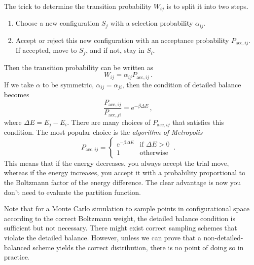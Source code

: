 \documentclass{article}
\theoremstyle{plain}\theoremheaderfont{\normalfont\itshape}\theorembodyfont{\rmfamily}\theoremseparator{.}\newtheorem*{rem}{Remark}\newtheorem*{ex}{Example}\newtheorem*{proof}{Proof}\newtheorem*{altp}{Alternative proof}
\theoremstyle{plain}\theoremheaderfont{\normalfont\bfseries}\theorembodyfont{\rmfamily}\theoremseparator{.}\newtheorem{thm}{Theorem}[section]\newtheorem{lem}[thm]{Lemma}\newtheorem{prop}[thm]{Proposition}\newtheorem*{cor}{Corollary}\newtheorem{defn}[thm]{Definition}\newtheorem{clm}[thm]{Claim}\newtheorem{clminproof}{Claim}\newtheorem{alg}[thm]{Algorithm}\newtheorem{hyp}[thm]{Hypothesis}\newtheorem{law}[thm]{Law}
\theoremstyle{break}\theoremheaderfont{\normalfont\itshape}\theorembodyfont{\rmfamily}\theoremseparator{.\medskip}\newtheorem*{proofskip}{Proof}\newtheorem*{exs}{Examples}\newtheorem*{rems}{Remarks}
\theoremstyle{break}\theoremheaderfont{\normalfont\bfseries}\theorembodyfont{\rmfamily}\theoremseparator{.\medskip}\newtheorem{lemskip}[thm]{Lemma}\newtheorem{defnskip}[thm]{Definition}\newtheorem{propskip}[thm]{Proposition}\newtheorem{thmskip}[thm]{Theorem}
\numberwithin{equation}{section}
\newcommand{\ee}{\mathrm{e}}
\begin{document}
    The trick to determine the transition probability \(W_{ij}\) is to split it into two steps.
    \begin{enumerate}
        \item Choose a new configuration \(S_j\) with a selection probability \(\alpha_{ij}\).
        \item Accept or reject this new configuration with an acceptance probability \(P_{\text{acc}, ij}\). If accepted, move to \(S_j\), and if not, stay in \(S_i\).
    \end{enumerate}
    Then the transition probability can be written as
    \begin{equation}
        W_{ij}=\alpha_{ij}P_{\text{acc}, ij}\,.
    \end{equation}
    If we take \(\alpha\) to be symmetric, \(\alpha_{ij}=\alpha_{ji}\), then the condition of detailed balance becomes
    \begin{equation}
        \frac{P_{\text{acc}, ij}}{P_{\text{acc}, ji}}=\ee^{-\beta\Delta E}\,,
    \end{equation}
    where \(\Delta E=E_j-E_i\). There are many choices of \(P_{\text{acc}, ij}\) that satisfies this condition. The most popular choice is the \textit{algorithm of Metropolis}
    \begin{equation}
        P_{\text{acc}, ij}=\begin{cases}
            \ee^{-\beta \Delta E} & \text{if }\Delta E>0\\
            1 & \text{otherwise}
        \end{cases}\,.
    \end{equation}
    This means that if the energy decreases, you always accept the trial move, whereas if the energy increases, you accept it with a probability proportional to the Boltzmann factor of the energy difference. The clear advantage is now you don't need to evaluate the partition function.

    Note that for a Monte Carlo simulation to sample points in configurational space according to the correct Boltzmann weight, the detailed balance condition is sufficient but not necessary. There might exist correct sampling schemes that violate the detailed balance. However, unless we can prove that a non-detailed-balanced scheme yields the correct distribution, there is no point of doing so in practice.
\end{document}
